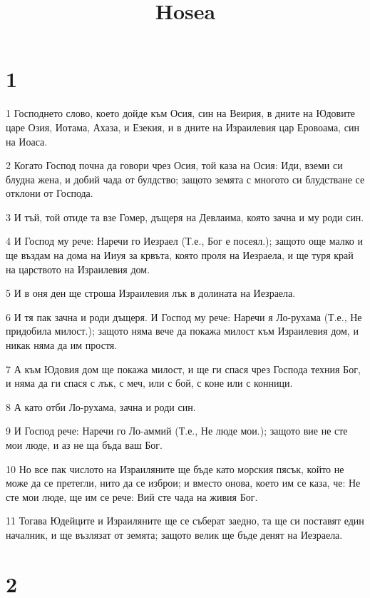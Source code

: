 

\title{Hosea}


\chapter{1}

\par 1 Господнето слово, което дойде към Осия, син на Веирия, в дните на Юдовите царе Озия, Иотама, Ахаза, и Езекия, и в дните на Израилевия цар Еровоама, син на Иоаса.
\par 2 Когато Господ почна да говори чрез Осия, той каза на Осия: Иди, вземи си блудна жена, и добий чада от булдство; защото земята с многото си блудстване се отклони от Господа.
\par 3 И тъй, той отиде та взе Гомер, дъщеря на Девлаима, която зачна и му роди син.
\par 4 И Господ му рече: Наречи го Иезраел (Т.е., Бог е посеял.); защото още малко и ще въздам на дома на Ииуя за крвъта, която проля на Иезраела, и ще туря край на царството на Израилевия дом.
\par 5 И в оня ден ще строша Израилевия лък в долината на Иезраела.
\par 6 И тя пак зачна и роди дъщеря. И Господ  му рече: Наречи я Ло-рухама (Т.е., Не придобила милост.); защото няма вече да покажа милост към Израилевия дом, и никак няма да им простя.
\par 7 А към Юдовия дом ще покажа милост, и ще ги спася чрез Господа техния Бог, и няма да ги спася с лък, с меч, или с бой, с коне или с конници.
\par 8 А като отби Ло-рухама, зачна и роди син.
\par 9 И Господ рече: Наречи го Ло-аммий (Т.е., Не люде мои.); защото вие не сте мои люде, и аз не ща бъда ваш Бог.
\par 10 Но все пак числото на Израиляните ще бъде като морския пясък, който не може да се претегли, нито да се изброи; и вместо онова, което им се каза, че: Не сте мои люде, ще им се рече: Вий сте чада на живия Бог.
\par 11 Тогава Юдейците и Израиляните ще се съберат заедно, та ще си поставят един началник, и ще възлязат от земята; защото велик ще бъде денят на Иезраела.

\chapter{2}

